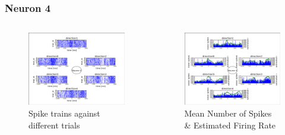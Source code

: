 \documentclass{beamer}
\begin{document}
\begin{frame}\frametitle{Neuron 4}
\begin{columns}
 \begin{column}{5cm}
  \begin{figure}
   \includegraphics[scale=0.25]{fig/neuron4spikes.png}
   \caption{Spike trains against different trials}
  \end{figure}
 \end{column}
 \begin{column}{5cm}
  \begin{figure}
   \includegraphics[scale=0.25]{fig/neuron4rates}
   \caption{Mean Number of Spikes \& Estimated Firing Rate}
  \end{figure}
 \end{column}
\end{columns}
\end{frame}
\end{document}
